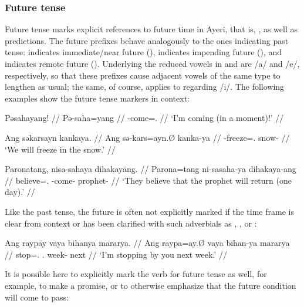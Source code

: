 
\subsubsection{Future tense}
\label{subsubsec:future}

Future tense marks explicit references to future time in Ayeri, that is,
, as well
as predictions. The future prefixes behave analogously to the ones indicating
past tense:  indicates immediate/near future (\NFut{}),
 indicates impending future (\Fut{}), and 
indicates remote future (\RFut{}). Underlying the reduced vowels in
 and  are /a/ and /e/, respectively, so that these
prefixes cause adjacent vowels of the same type to lengthen as
usual; the same, of course, applies to 
regarding /i/. The following examples show the future tense markers in context:

\pex
\a\label{ex:nfut}\begingl
	\gla Pəsahayang! //
	\glb Pə-saha=yang //
	\glc \NFut{}-come=\Fsg{}.\Aarg{} //
	\glft `I'm coming (in a moment)!' //
\endgl

\a\label{ex:fut}\begingl
	\gla Ang səkarsayn kankaya. //
	\glb Ang sə-kars=ayn.Ø kanka-ya //
	\glc \AgtT{} \Fut{}-freeze=\Fsg{}.\Top{} snow-\Loc{} //
	\glft `We will freeze in the snow.' //
\endgl

\a\label{ex:rfut}\begingl
	\gla Paronatang, nisa-sahaya dihakayāng. //
	\glb Parona=tang ni-sa\til{}saha-ya dihakaya-ang //
	\glc believe=\TplM{}.\Aarg{} \RFut{}-\Iter{}\til{}come-\TsgM{} 
		prophet-\Aarg{} //
	\glft `They believe that the prophet will return (one day).' //
\endgl

\xe

Like the past tense, the future is often not explicitly marked if the time 
frame is clear from context or has been clarified with such adverbials as 
, , or :

\ex\begingl
	\gla Ang raypāy vaya bihanya mararya. //
	\glb Ang raypa=ay.Ø vaya bihan-ya mararya //
	\glc \AgtT{} stop=\Fsg{}.\Top{} \Ssg{}.\Loc{} week-\Loc{} next //
	\glft `I'm stopping by you next week.' //
\endgl\xe

It is possible here to explicitly mark the verb for future tense as well, for
example, to make a promise, or to otherwise emphasize that the future condition
will come to pass:

